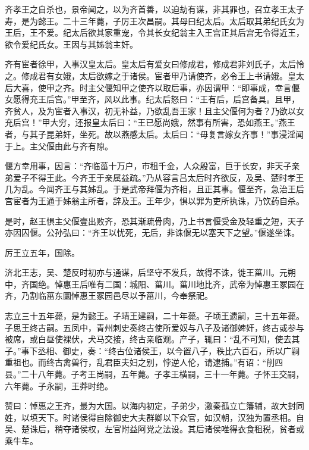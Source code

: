 \documentclass[12pt,UTF8]{ctexbook}
\begin{document}
齐孝王之自杀也，景帝闻之，以为齐首善，以迫劫有谋，非其罪也，召立孝王太子寿，是为懿王。二十三年薨，子厉王次昌嗣。其母曰纪太后。太后取其弟纪氏女为王后，王不爱。纪太后欲其家重宠，令其长女纪翁主入王宫正其后宫无令得近王，欲令爱纪氏女。王因与其姊翁主奸。



齐有宦者徐甲，入事汉皇太后。皇太后有爱女曰修成君，修成君非刘氏子，太后怜之。修成君有女娥，太后欲嫁之于诸侯。宦者甲乃请使齐，必令王上书请娥。皇太后大喜，使甲之齐。时主父偃知甲之使齐以取后事，亦因谓甲：“即事成，幸言偃女愿得充王后宫。”甲至齐，风以此事。纪太后怒曰：“王有后，后宫备具。且甲，齐贫人，及为宦者入事汉，初无补益，乃欲乱吾王家！且主父偃何为者？乃欲以女充后宫！”甲大穷，还报皇太后曰：“王已愿尚娥，然事有所害，恐如燕王。”燕王者，与其子昆弟奸，坐死。故以燕感太后。太后曰：“毋复言嫁女齐事！”事浸淫闻于上。主父偃由此与齐有隙。



偃方幸用事，因言：“齐临菑十万户，市租千金，人众殷富，巨于长安，非天子亲弟爱子不得王此。今齐王于亲属益疏。”乃从容言吕太后时齐欲反，及吴、楚时孝王几为乱。今闻齐王与其姊乱。于是武帝拜偃为齐相，且正其事。偃至齐，急治王后宫宦者为王通于姊翁主所者，辞及王。王年少，惧以罪为吏所执诛，乃饮药自杀。



是时，赵王惧主父偃壹出败齐，恐其渐疏骨肉，乃上书言偃受金及轻重之短，天子亦因囚偃。公孙弘曰：“齐王以忧死，无后，非诛偃无以塞天下之望。”偃遂坐诛。



厉王立五年，国除。



济北王志，吴、楚反时初亦与通谋，后坚守不发兵，故得不诛，徙王菑川。元朔中，齐国绝。悼惠王后唯有二国：城阳、菑川。菑川地比齐，武帝为悼惠王冢园在齐，乃割临菑东圜悼惠王冢园邑尽以予菑川，今奉祭祀。



志立三十五年薨，是为懿王。子靖王建嗣，二十年薨。子顷王遗嗣，三十五年薨。子思王终古嗣。五凤中，青州刺史奏终古使所爱奴与八子及诸御婢奸，终古或参与被席，或白昼使裸伏，犬马交接，终古亲临观。产子，辄曰：“乱不可知，使去其子。”事下丞相、御史，奏：“终古位诸侯王，以今置八子，秩比六百石，所以广嗣重祖也。而终古禽兽行，乱君臣夫妇之别，悖逆人伦，请逮捕。”有诏：“削四县。”二十八年薨。子考王尚嗣，五年薨。子孝王横嗣，三十一年薨。子怀王交嗣，六年薨。子永嗣，王莽时绝。



赞曰：悼惠之王齐，最为大国。以海内初定，子弟少，激秦孤立亡籓辅，故大封同姓，以填天下。时诸侯得自除御史大夫群卿以下众官，如汉朝，汉独为置丞相。自吴、楚诛后，稍夺诸侯权，左官附益阿党之法设。其后诸侯唯得衣食租税，贫者或乘牛车。
\end{document}
